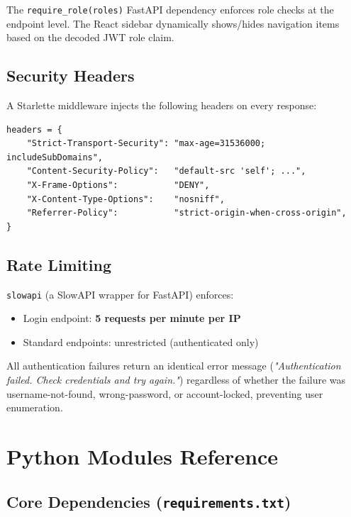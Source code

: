 \documentclass[12pt,a4paper]{article}
\begin{document}
The \texttt{require\_role(roles)} FastAPI dependency enforces role checks at
the endpoint level. The React sidebar dynamically shows/hides navigation items
based on the decoded JWT role claim.

\subsection{Security Headers}

A Starlette middleware injects the following headers on every response:

\begin{lstlisting}[style=python, caption={Security headers middleware (main.py)}]
headers = {
    "Strict-Transport-Security": "max-age=31536000; includeSubDomains",
    "Content-Security-Policy":   "default-src 'self'; ...",
    "X-Frame-Options":           "DENY",
    "X-Content-Type-Options":    "nosniff",
    "Referrer-Policy":           "strict-origin-when-cross-origin",
}
\end{lstlisting}

\subsection{Rate Limiting}

\texttt{slowapi} (a SlowAPI wrapper for FastAPI) enforces:
\begin{itemize}[noitemsep]
    \item Login endpoint: \textbf{5 requests per minute per IP}
    \item Standard endpoints: unrestricted (authenticated only)
\end{itemize}

All authentication failures return an identical error message
(\emph{"Authentication failed. Check credentials and try again."})
regardless of whether the failure was username-not-found, wrong-password,
or account-locked, preventing user enumeration.

\section{Python Modules Reference}

\subsection{Core Dependencies (\texttt{requirements.txt})}
\end{document}
